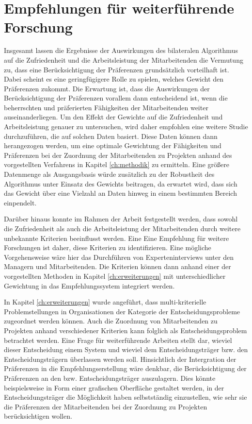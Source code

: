 \section{Empfehlungen für weiterführende Forschung}
Insgesamt lassen die Ergebnisse der Auswirkungen des bilateralen Algorithmus auf die Zufriedenheit und die Arbeitsleistung der Mitarbeitenden die Vermutung zu, dass eine Berücksichtigung der Präferenzen grundsätzlich vorteilhaft ist.
Dabei scheint es eine geringfügigere Rolle zu spielen, welches Gewicht den Präferenzen zukommt.
Die Erwartung ist, dass die Auswirkungen der Berücksichtigung der Präferenzen vorallem dann entscheidend ist, wenn die beherrschten und präferierten Fähigkeiten der Mitarbeitenden weiter auseinanderliegen.
Um den Effekt der Gewichte auf die Zufriedenheit und Arbeitsleistung genauer zu untersuchen, wird daher empfohlen eine weitere Studie durchzuführen, die auf solchen Daten basiert.
Diese Daten können dann herangezogen werden, um eine optimale Gewichtung der Fähigkeiten und Präferenzen bei der Zuordnung der Mitarbeitenden zu Projekten anhand des vorgestellten Verfahrens in Kapitel \ref{ch:methodik} zu ermitteln.
Eine größere Datenmenge als Ausgangsbasis würde zusätzlich zu der Robustheit des Algorithmus unter Einsatz des Gewichts beitragen, da erwartet wird, dass sich das Gewicht über eine Vielzahl an Daten hinweg in einem bestimmten Bereich einpendelt.

Darüber hinaus konnte im Rahmen der Arbeit festgestellt werden, dass sowohl die Zufriedenheit als auch die Arbeitsleistung der Mitarbeitenden durch weitere unbekannte Kriterien beeinflusst werden.
Eine 
Eine Empfehlung für weitere Forschungen ist daher, diese Kriterien zu identifizieren.
Eine mögliche Vorgehensweise wäre hier das Durchführen von Experteninterviews unter den Managern und Mitarbeitenden.
Die Kriterien können dann anhand einer der vorgestellten Methoden in Kapitel \ref{ch:erweiterungen} mit unterschiedlicher Gewichtung in das Empfehlungssystem integriert werden.

In Kapitel \ref{ch:erweiterungen} wurde angeführt, dass multi-kriterielle Problemstellungen in Organisationen der Kategorie der Entscheidungsprobleme zugeordnet werden können.
Auch die Zuordnung von Mitarbeitenden zu Projekten anhand verschiedener Kriterien kann folglich als Entscheidungsproblem betrachtet werden.
Eine Frage für weiterführende Arbeiten stellt dar, wieviel dieser Entscheidung einem System und wieviel dem Entscheidungsträger bzw. den Entscheidungsträgern überlassen werden soll.
Hinsichtlich der Intergration der Präferenzen in die Empfehlungserstellung wäre denkbar, die Berücksichtigung der Präferenzen an den bzw. Entscheidungsträger auszulagern.
Dies könnte beispielsweise in Form einer grafischen Oberfläche gestaltet werden, in der Entscheidungsträger die Möglichkeit haben selbstständig einzustellen, wie sehr sie die Präferenzen der Mitarbeitenden bei der Zuordnung zu Projekten berücksichtigen wollen.

